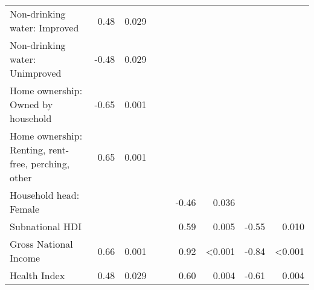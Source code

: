\begin{tabular}{l r r r r r r r r}
Non-drinking water: Improved  &  0.48  &  0.029  &    &    &    &    &    &    \\
Non-drinking water: Unimproved  &  -0.48  &  0.029  &    &    &    &    &    &    \\
Home ownership: Owned by household  &  -0.65  &  0.001  &    &    &    &    &    &    \\
Home ownership: Renting, rent-free, perching, other  &  0.65  &  0.001  &    &    &    &    &    &    \\
Household head: Female  &    &    &    &    &  -0.46  &  0.036  &    &    \\
Subnational HDI  &    &    &    &    &  0.59  &  0.005  &  -0.55  &  0.010  \\
Gross National Income  &  0.66  &  0.001  &    &    &  0.92  &  \textless{}0.001  &  -0.84  &  \textless{}0.001  \\
Health Index  &  0.48  &  0.029  &    &    &  0.60  &  0.004  &  -0.61  &  0.004  \\
\bottomrule
\end{tabular}
